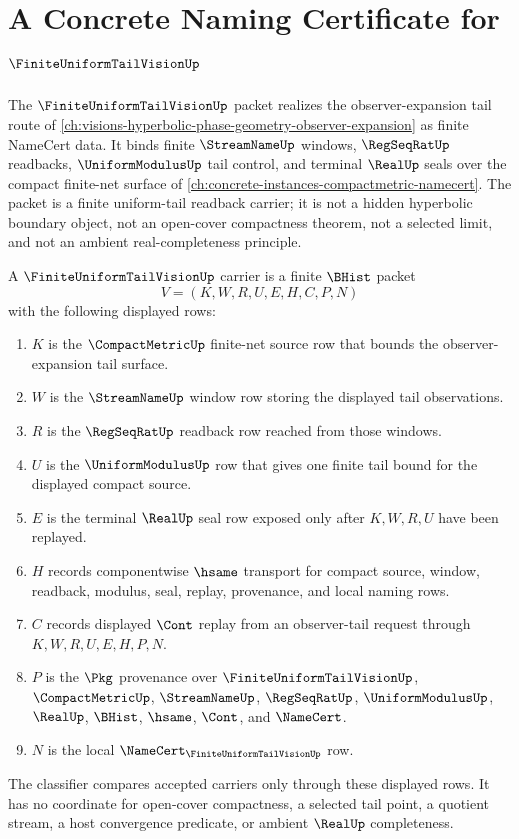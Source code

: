 \chapter{A Concrete Naming Certificate for $\FiniteUniformTailVisionUp$}
\label{ch:concrete-instances-finite-uniform-tail-vision-namecert}

The $\FiniteUniformTailVisionUp$ packet realizes the observer-expansion tail route of \autoref{ch:visions-hyperbolic-phase-geometry-observer-expansion} as finite NameCert data. It binds finite $\StreamNameUp$ windows, $\RegSeqRatUp$ readbacks, $\UniformModulusUp$ tail control, and terminal $\RealUp$ seals over the compact finite-net surface of \autoref{ch:concrete-instances-compactmetric-namecert}. The packet is a finite uniform-tail readback carrier; it is not a hidden hyperbolic boundary object, not an open-cover compactness theorem, not a selected limit, and not an ambient real-completeness principle.

\begin{definition}
\label{def:finite-uniform-tail-vision-carrier}
A $\FiniteUniformTailVisionUp$ carrier is a finite $\BHist$ packet
$$
V=(K,W,R,U,E,H,C,P,N)
$$
with the following displayed rows:
\begin{enumerate}
\item $K$ is the $\CompactMetricUp$ finite-net source row that bounds the observer-expansion tail surface.
\item $W$ is the $\StreamNameUp$ window row storing the displayed tail observations.
\item $R$ is the $\RegSeqRatUp$ readback row reached from those windows.
\item $U$ is the $\UniformModulusUp$ row that gives one finite tail bound for the displayed compact source.
\item $E$ is the terminal $\RealUp$ seal row exposed only after $K,W,R,U$ have been replayed.
\item $H$ records componentwise $\hsame$ transport for compact source, window, readback, modulus, seal, replay, provenance, and local naming rows.
\item $C$ records displayed $\Cont$ replay from an observer-tail request through $K,W,R,U,E,H,P,N$.
\item $P$ is the $\Pkg$ provenance over $\FiniteUniformTailVisionUp$, $\CompactMetricUp$, $\StreamNameUp$, $\RegSeqRatUp$, $\UniformModulusUp$, $\RealUp$, $\BHist$, $\hsame$, $\Cont$, and $\NameCert$.
\item $N$ is the local $\NameCert_{\FiniteUniformTailVisionUp}$ row.
\end{enumerate}
The classifier compares accepted carriers only through these displayed rows. It has no coordinate for open-cover compactness, a selected tail point, a quotient stream, a host convergence predicate, or ambient $\RealUp$ completeness.
\end{definition}

